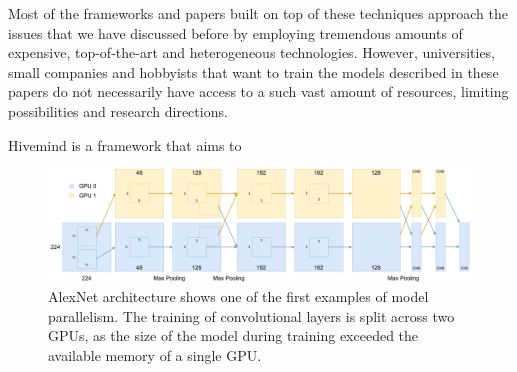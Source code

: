 Most of the frameworks and papers built on top of these techniques approach the issues that we have discussed before by employing tremendous amounts of expensive, top-of-the-art and heterogeneous technologies.
However, universities, small companies and hobbyists that want to train the models described in these papers do not necessarily have access to a such vast amount of resources, limiting possibilities and research directions.


Hivemind \cite{riabinin2020hivemind} is a framework that aims to 

\begin{figure}[h]
    \caption{AlexNet \cite{alexnet2012} architecture shows one of the first examples of model parallelism. The training of convolutional layers is split across two GPUs, as the size of the model during training exceeded the available memory of a single GPU.}
    \label{fig:alexnet}
    \includegraphics[width=\textwidth]{./figures/alexnet.pdf}
\end{figure}
